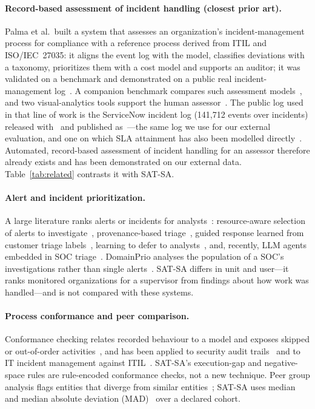 \paragraph{Record-based assessment of incident handling (closest prior art).}
Palma et al.\ built a system that assesses an organization's incident-management
process for compliance with a reference process derived from ITIL and ISO/IEC~27035:
it aligns the event log with the model, classifies deviations with a taxonomy,
prioritizes them with a cost model and supports an auditor; it was validated on a
benchmark and demonstrated on a public real incident-management log~\cite{palma2024compliance}.
A companion benchmark compares such assessment models~\cite{palma2024benchimp}, and
two visual-analytics tools support the human assessor~\cite{palma2024eurova,palma2025impavid}.
The public log used in that line of work is the ServiceNow incident log (141,712 events
over  incidents) released with~\cite{amaral2019completion} and published
as~\cite{amaral2018uci498}---the same log we use for our external evaluation, and one
on which SLA attainment has also been modelled directly~\cite{swain2022sla}. Automated,
record-based assessment of incident handling for an assessor therefore already exists
and has been demonstrated on our external data. Table~\ref{tab:related} contrasts it
with SAT-SA.



\paragraph{Alert and incident prioritization.} A large literature ranks alerts or
incidents for analysts~\cite{jalalvand2024prioritisation,tariq2025alertfatigue}:
resource-aware selection of alerts to investigate~\cite{shah2019alertselection},
provenance-based triage~\cite{hassan2019nodoze}, guided response learned from
customer triage labels~\cite{freitas2024guide}, learning to defer to
analysts~\cite{jalalvand2025l2d}, and, recently, LLM agents embedded in SOC
triage~\cite{banstola2026agentic}. DomainPrio analyses the population of a SOC's
investigations rather than single alerts~\cite{chiba2022domainprio}. SAT-SA differs in
unit and user---it ranks monitored organizations for a supervisor from findings about
how work was handled---and is not compared with these systems.

\paragraph{Process conformance and peer comparison.} Conformance checking relates
recorded behaviour to a model and exposes skipped or out-of-order
activities~\cite{rozinat2008conformance,carmona2018conformance,vanderaalst2016pm},
and has been applied to security audit trails~\cite{vanderaalst2005security} and to
IT incident management against ITIL~\cite{ferreira2008itil}. SAT-SA's execution-gap
and negative-space rules are rule-encoded conformance checks, not a new technique.
Peer group analysis flags entities that diverge from similar
entities~\cite{weston2008pga,bolton2002fraud}; SAT-SA uses median and median absolute
deviation (MAD)~\cite{leys2013mad} over a declared cohort.

